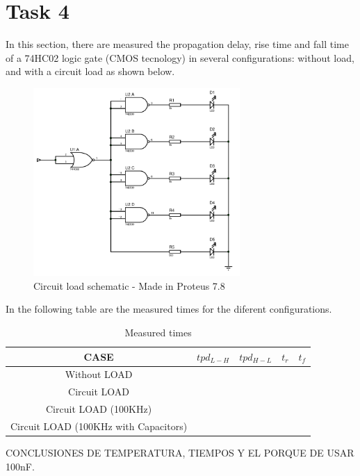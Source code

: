 \newpage

\section*{Task 4}
In this section, there are measured the 
propagation delay, rise time and fall time of
 a 74HC02 logic gate (CMOS tecnology) in 
 several configurations: without load, and with
  a circuit load as shown below.
  
  \begin{figure}[H]
    \begin{centering}
    \includegraphics[width=0.7\textwidth]{data/circuitLED}
    \par\end{centering}
    \caption{Circuit load schematic - Made in Proteus 7.8}
\end{figure}

In the following table are the measured times
for the diferent configurations.

\begin{table}[H]
    \begin{center}
    \begin{tabular}{|c|c|c|c|c|}
    \hline
    CASE & $tpd_{L-H}$ & $tpd_{H-L}$ & $t_r$ & $t_f$\\
    \hline \hline
    Without LOAD & & & &  \\ \hline
    Circuit LOAD & & & & \\ \hline
    Circuit LOAD (100KHz) & & & & \\ \hline
    Circuit LOAD (100KHz with Capacitors) & & & & \\ \hline
    \end{tabular}
    \caption{Measured times}
    \end{center}
\end{table}

CONCLUSIONES DE TEMPERATURA, TIEMPOS Y EL PORQUE
DE USAR 100nF.


